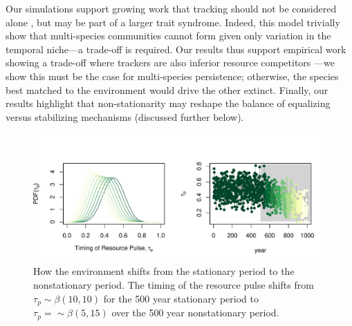 \documentclass[11pt,letterpaper]{article}
\begin{document}
Our simulations support growing work that tracking should not be considered alone \citep{Diamond:2011nx,Dorji2013,Ishioka2013,kharouba2014,du2017}, but may be part of a larger trait syndrome. Indeed, this model trivially show that multi-species communities cannot form given only variation in the temporal niche---a trade-off is required. Our results thus support empirical work showing a trade-off where trackers are also inferior resource competitors \citep{lasky2016,Zhu2016BioLetters}---we show this must be the case for multi-species persistence; otherwise, the species best matched to the environment would drive the other extinct. Finally, our results highlight that non-stationarity may reshape the balance of equalizing versus stabilizing mechanisms (discussed further below). 

\begin{figure}[t!]
\centering
\includegraphics[width=1\textwidth]{..//..//..//R/graphs/modelruns/manuscript/modelsupp.pdf}
\caption{How the environment shifts from the stationary period to the nonstationary period. The timing of the resource pulse shifts from $\tau_{p} \sim \beta(10,10)$ for the 500 year stationary period to $\tau_{p}=\sim \beta(5,15)$ over the 500 year nonstationary period.}
\label{fig:figR0}
\end{figure}
\end{document}
